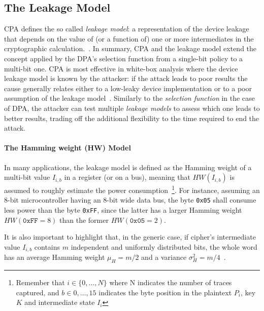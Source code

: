         \subsection{The Leakage Model}
            CPA defines the so called \emph{leakage model}: a representation of the device leakage that depends
            on the value of (or a function of) one or more intermediates in the cryptographic calculation.~\cite{kocher2011introduction}. In summary, CPA and the leakage model extend the concept applied by the DPA's selection function from a single-bit policy to a multi-bit one. CPA is most effective in white-box analysis where the device leakage model is known by the attacker: if the attack leads to poor results the cause generally relates either to a low-leaky device implementation or to a poor assumption of the leakage model~\cite{kocher2011introduction}. Similarly to the \emph{selection function} in the case of DPA, the attacker can test multiple \emph{leakage models} to assess which one leads to better results, trading off the additional flexibility to the time required to end the attack. 
            
            \paragraph{The Hamming weight (HW) Model}
                In many applications, the leakage model is defined as the Hamming weight of a multi-bit value $I_{i,b}$ in a register (or on a bus), meaning that $HW(I_{i,b})$ is assumed to roughly estimate the power consumption~\footnote{Remember that $i \in \{0,\dots,N\}$ where N indicates the number of traces captured, and $b \in {0,\dots,15}$ indicates the byte position in the plaintext $P_i$, key $K$ and intermediate state $I_i$}. For instance, assuming an 8-bit microcontroller having an 8-bit wide data bus, the byte \texttt{0x05} shall consume less power than the byte \texttt{0xFF}, since the latter has a larger Hamming weight $HW(\texttt{0xFF} = 8)$ than the former $HW(\texttt{0x05} = 2)$.

                It is also important to highlight that, in the generic case, if cipher's intermediate value $I_{i,b}$ contains $m$ independent and uniformly distributed bits, the whole word has an average Hamming weight $\mu_H = m/2$ and a variance $\sigma^2_H = m/4$~\cite{brier2004correlation}.
                
